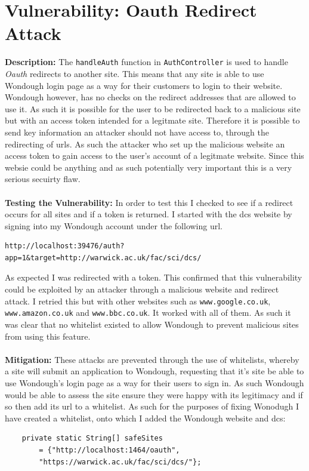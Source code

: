 \section{Vulnerability: Oauth Redirect Attack}
\label{sec:background}
\textbf{Description:} The \verb|handleAuth| function in \verb|AuthController| is used to handle \textit{Oauth} redirects to another site. This means that any site is able to use
Wondough login page as a way for their customers to login to their website. Wondough however, has no checks on the redirect addresses that are allowed to use it. As such it is
possible for the user to be redirected back to a malicious site but with an access token intended for a legitmate site. Therefore it is possible to send key information an attacker
should not have access to, through the redirecting of urls. As such the attacker who set up the malicious website an access token to gain access to the user's account of a legitmate
website. Since this websie could be anything and as such potentially very important this is a very serious secuirty flaw.\\ \\
\textbf{Testing the Vulnerability:} In order to test this I checked to see if a redirect occurs for all sites and if a token is returned. I started with the dcs website by signing
into my Wondough account under the following url.
\begin{verbatim}
http://localhost:39476/auth?app=1&target=http://warwick.ac.uk/fac/sci/dcs/
\end{verbatim}
As expected I was redirected with a token. This confirmed that this vulnerability could be exploited by an attacker through a malicious website and redirect attack. I retried this
but with other websites such as \verb|www.google.co.uk|, \verb|www.amazon.co.uk| and \verb|www.bbc.co.uk|. It worked with all of them. As such it was clear that no whitelist 
existed to allow Wondough to prevent malicious sites from using this feature. \\ \\
\textbf{Mitigation:} These attacks are prevented through the use of whitelists, whereby a site will submit an application to Wondough, requesting that it's site be able to use
Wondough's login page as a way for their users to sign in. As such Wondough would be able to assess the site ensure they were happy with its legitimacy and if so then add its url
to a whitelist. As such for the purposes of fixing Wonodugh I have created a whitelist, onto which I added the Wondough website and dcs:
\begin{verbatim}
    private static String[] safeSites
        = {"http://localhost:1464/oauth",
        "https://warwick.ac.uk/fac/sci/dcs/"};
\end{verbatim}
